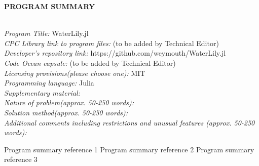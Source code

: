 \documentclass[final,3p,times]{elsarticle}
\begin{document}
{\bf PROGRAM SUMMARY}
\\
\\
\begin{small}
\noindent
{\em Program Title:} WaterLily.jl \\
{\em CPC Library link to program files:} (to be added by Technical Editor) \\
{\em Developer's repository link:} https://github.com/weymouth/WaterLily.jl \\
{\em Code Ocean capsule:} (to be added by Technical Editor)\\
{\em Licensing provisions(please choose one):} MIT \\
{\em Programming language:} Julia \\
{\em Supplementary material:} \\
{\em Nature of problem(approx. 50-250 words):}\\
{\em Solution method(approx. 50-250 words):}\\
{\em Additional comments including restrictions and unusual features (approx. 50-250 words):}\\

\begin{thebibliography}{0}
Program summary reference 1         %
Program summary reference 2         %
Program summary reference 3         %
\end{thebibliography}
\end{small}
\end{document}
